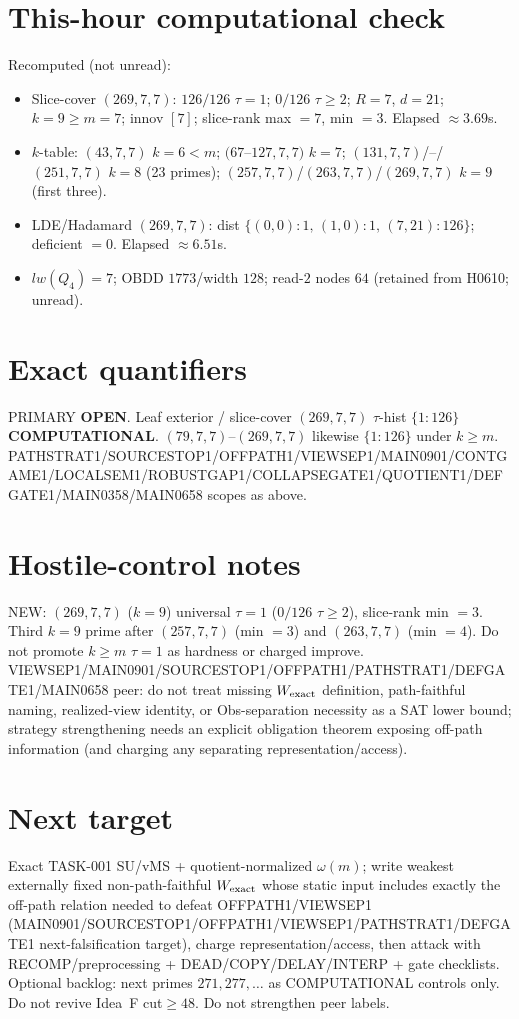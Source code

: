 \documentclass[11pt]{article}
\begin{document}
\section*{This-hour computational check}
Recomputed (not unread):
\begin{itemize}
\item Slice-cover $(269,7,7)$: $126/126$ $\tau{=}1$; $0/126$ $\tau{\ge}2$; $R{=}7$, $d{=}21$;
  $k{=}9{\ge}m{=}7$; innov $[7]$; slice-rank max $=7$, min $=3$. Elapsed $\approx3.69$s.
\item $k$-table: $(43,7,7)$ $k{=}6{<}m$; $(67$--$127,7,7)$ $k{=}7$;
  $(131,7,7)$/--/$(251,7,7)$ $k{=}8$ (23 primes); $(257,7,7)$/$(263,7,7)$/$(269,7,7)$ $k{=}9$ (first three).
\item LDE/Hadamard $(269,7,7)$: dist $\{(0,0){:}1,\,(1,0){:}1,\,(7,21){:}126\}$; deficient $=0$. Elapsed $\approx6.51$s.
\item $lw(Q_4)=7$; OBDD $1773$/width $128$; read-$2$ nodes $64$ (retained from H0610; unread).
\end{itemize}

\section*{Exact quantifiers}
PRIMARY \textbf{OPEN}. Leaf exterior / slice-cover $(269,7,7)$ $\tau$-hist $\{1{:}126\}$ \textbf{COMPUTATIONAL}.
$(79,7,7)$--$(269,7,7)$ likewise $\{1{:}126\}$ under $k{\ge}m$.
PATHSTRAT1/SOURCESTOP1/OFFPATH1/VIEWSEP1/MAIN0901/CONTGAME1/LOCALSEM1/ROBUSTGAP1/COLLAPSEGATE1/QUOTIENT1/DEFGATE1/MAIN0358/MAIN0658 scopes as above.

\section*{Hostile-control notes}
NEW: $(269,7,7)$ ($k{=}9$) universal $\tau{=}1$ ($0/126$ $\tau{\ge}2$), slice-rank min $=3$.
Third $k{=}9$ prime after $(257,7,7)$ (min $=3$) and $(263,7,7)$ (min $=4$).
Do not promote $k{\ge}m$ $\tau{=}1$ as hardness or charged improve.
VIEWSEP1/MAIN0901/SOURCESTOP1/OFFPATH1/PATHSTRAT1/DEFGATE1/MAIN0658 peer: do not treat missing $W_{\rm exact}$ definition,
path-faithful naming, realized-view identity, or Obs-separation necessity as a SAT lower bound;
strategy strengthening needs an explicit obligation theorem exposing off-path information
(and charging any separating representation/access).

\section*{Next target}
Exact TASK-001 SU/vMS + quotient-normalized $\omega(m)$; write weakest externally fixed non-path-faithful
$W_{\rm exact}$ whose static input includes exactly the off-path relation needed to defeat OFFPATH1/VIEWSEP1
(MAIN0901/SOURCESTOP1/OFFPATH1/VIEWSEP1/PATHSTRAT1/DEFGATE1 next-falsification target), charge representation/access,
then attack with RECOMP/preprocessing + DEAD/COPY/DELAY/INTERP + gate checklists.
Optional backlog: next primes $271,277,\ldots$ as COMPUTATIONAL controls only.
Do not revive Idea~F cut$\ge48$. Do not strengthen peer labels.
\end{document}
